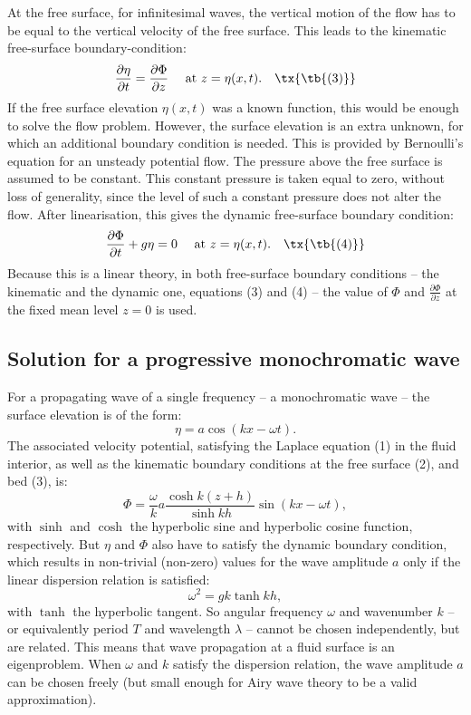 \documentclass[a4paper,12pt]{report}
\begin{document}
At the free surface, for infinitesimal waves, the vertical motion of the flow has to be equal to the vertical velocity of the free surface. This leads to the kinematic free-surface boundary-condition:
\begin{equation}
\frac{\partial \eta}{\partial t} = \frac{\partial \Phi}{\partial z} \quad \text{ at } z = \eta(x,t).\quad\tx{\tb{(3)}}
\end{equation}
If the free surface elevation \( \eta(x,t) \) was a known function, this would be enough to solve the flow problem. However, the surface elevation is an extra unknown, for which an additional boundary condition is needed. This is provided by Bernoulli's equation for an unsteady potential flow. The pressure above the free surface is assumed to be constant. This constant pressure is taken equal to zero, without loss of generality, since the level of such a constant pressure does not alter the flow. After linearisation, this gives the dynamic free-surface boundary condition:
\begin{equation}
\frac{\partial \Phi}{\partial t} + g \eta = 0 \quad \text{ at } z = \eta(x,t).\quad\tx{\tb{(4)}}
\end{equation}
Because this is a linear theory, in both free-surface boundary conditions – the kinematic and the dynamic one, equations (3) and (4) – the value of \( \Phi \) and \( \frac{\partial \Phi}{\partial z} \) at the fixed mean level \( z = 0 \) is used.
\subsection{Solution for a progressive monochromatic wave}
For a propagating wave of a single frequency – a monochromatic wave – the surface elevation is of the form:
\[
\eta = a \cos ( k x - \omega t ).
\]
The associated velocity potential, satisfying the Laplace equation (1) in the fluid interior, as well as the kinematic boundary conditions at the free surface (2), and bed (3), is:
\[
\Phi = \frac{\omega}{k} a \frac{\cosh k (z+h) }{\sinh k h} \sin ( k x - \omega t),
\]
with \( \sinh \) and \( \cosh \) the hyperbolic sine and hyperbolic cosine function, respectively. But \( \eta \) and \( \Phi \) also have to satisfy the dynamic boundary condition, which results in non-trivial (non-zero) values for the wave amplitude \( a \) only if the linear dispersion relation is satisfied:
\[
\omega^2 = g k \tanh k h,
\]
with \( \tanh \) the hyperbolic tangent. So angular frequency \( \omega \) and wavenumber \( k \) – or equivalently period \( T \) and wavelength \( \lambda \) – cannot be chosen independently, but are related. This means that wave propagation at a fluid surface is an eigenproblem. When \( \omega \) and \( k \) satisfy the dispersion relation, the wave amplitude \( a \) can be chosen freely (but small enough for Airy wave theory to be a valid approximation).
\end{document}
